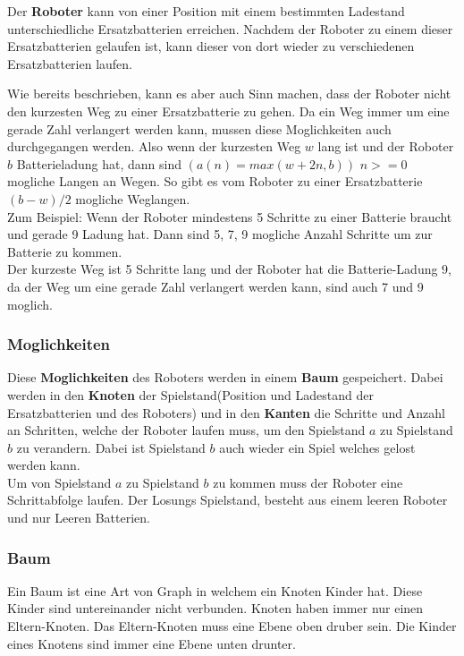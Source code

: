 \documentclass[a4paper,12pt,arial]{scrartcl}
\begin{document}
Der \textbf{Roboter} kann von einer Position mit einem bestimmten Ladestand unterschiedliche Ersatzbatterien erreichen. Nachdem der Roboter zu einem dieser Ersatzbatterien gelaufen ist, kann dieser von dort wieder zu verschiedenen Ersatzbatterien laufen.
\par
Wie bereits beschrieben, kann es aber auch Sinn machen, dass der Roboter nicht den kurzesten Weg zu einer Ersatzbatterie zu gehen. Da ein Weg immer um eine gerade Zahl verlangert werden kann, mussen diese Moglichkeiten auch durchgegangen werden.
Also wenn der kurzesten Weg $w$ lang ist und der Roboter $b$ Batterieladung hat, dann sind $(a(n)  = max(w + 2n, b))$ $n >= 0$ mogliche Langen an Wegen.
So gibt es vom Roboter zu einer Ersatzbatterie $(b - w) / 2$ mogliche Weglangen.
\\
Zum Beispiel:
Wenn der Roboter mindestens 5 Schritte zu einer Batterie braucht und gerade 9 Ladung hat. Dann sind 5, 7, 9 mogliche Anzahl Schritte um zur Batterie zu kommen.
\\
Der kurzeste Weg ist 5 Schritte lang und der Roboter hat die Batterie-Ladung 9, da der Weg um eine gerade Zahl verlangert werden kann, sind auch 7 und 9 moglich.

\subsubsection{Moglichkeiten}

Diese \textbf{Moglichkeiten} des Roboters werden in einem \textbf{Baum} gespeichert.
Dabei werden in den \textbf{Knoten} der Spielstand(Position und Ladestand der Ersatzbatterien und des Roboters) und in den \textbf{Kanten} die Schritte und Anzahl an Schritten, welche der Roboter laufen muss, um den Spielstand $a$ zu Spielstand $b$ zu verandern.
Dabei ist Spielstand $b$ auch wieder ein Spiel welches gelost werden kann.
\\
Um von Spielstand $a$ zu Spielstand $b$ zu kommen muss der Roboter eine Schrittabfolge laufen.
Der Losungs Spielstand, besteht aus einem leeren Roboter und nur Leeren Batterien.


\par
\subsubsection{Baum}
Ein Baum ist eine Art von Graph in welchem ein Knoten Kinder hat. Diese Kinder sind untereinander nicht verbunden.
Knoten haben immer nur einen Eltern-Knoten. Das Eltern-Knoten muss eine Ebene oben druber sein. Die Kinder eines Knotens sind immer eine Ebene unten drunter.
\end{document}
